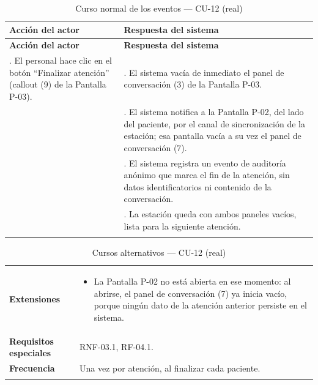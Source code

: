 \setlength{\extrarowheight}{5pt}
\begin{longtable}{@{}>{\raggedright\arraybackslash}p{} >{\raggedright\arraybackslash}p{}@{}}
\toprule
\textbf{Acción del actor} & \textbf{Respuesta del sistema} \\
\midrule
\endfirsthead
\toprule
\textbf{Acción del actor} & \textbf{Respuesta del sistema} \\
\midrule
\endhead
1. El personal hace clic en el botón ``Finalizar atención'' (callout (9)
de la Pantalla P-03). &
2. El sistema vacía de inmediato el panel de conversación (3) de la
Pantalla P-03. \\
&
3. El sistema notifica a la Pantalla P-02, del lado del paciente, por el
canal de sincronización de la estación; esa pantalla vacía a su vez el
panel de conversación (7). \\
&
4. El sistema registra un evento de auditoría anónimo que marca el fin
de la atención, sin datos identificatorios ni contenido de la
conversación. \\
&
5. La estación queda con ambos paneles vacíos, lista para la siguiente
atención. \\
\bottomrule
\caption{Curso normal de los eventos --- CU-12 (real)}
\end{longtable}
\setlength{\extrarowheight}{0pt}

\begin{longtable}{@{}p{4.1cm} >{\raggedright\arraybackslash}p{11.2cm}@{}}
\toprule
\textbf{Extensiones} &
\begin{itemize}[leftmargin=*, itemsep=2pt]
    \item[3a.] La Pantalla P-02 no está abierta en ese momento: al
    abrirse, el panel de conversación (7) ya inicia vacío, porque ningún
    dato de la atención anterior persiste en el sistema.
\end{itemize} \\
\textbf{Requisitos especiales} & RNF-03.1, RF-04.1. \\
\textbf{Frecuencia} &
Una vez por atención, al finalizar cada paciente. \\
\bottomrule
\caption{Cursos alternativos --- CU-12 (real)}
\end{longtable}
